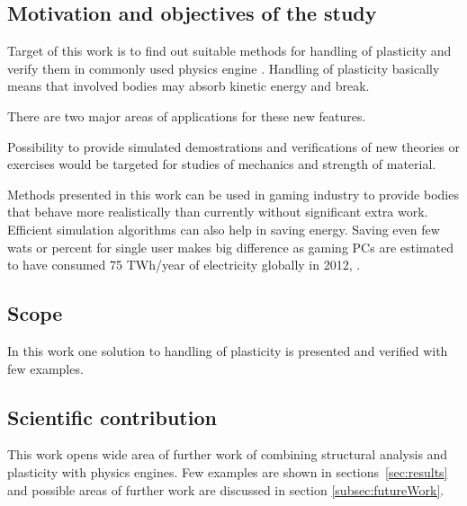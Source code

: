 \subsection{Motivation and objectives of the study}

Target of this work is to find out suitable methods for handling of plasticity and verify them 
in commonly used physics engine \bullet. 
Handling of plasticity basically means that involved bodies may absorb kinetic energy and break. 

There are two major areas of applications for these new features.

Possibility to provide simulated demostrations and verifications of new theories or exercises  would be targeted for 
studies of mechanics and strength of material. 
 
Methods presented in this work can be used in gaming industry to provide 
bodies that behave more realistically than currently without significant extra work. 
Efficient simulation algorithms can also help in saving energy. 
Saving even few wats or percent for single user makes big difference as gaming PCs are estimated to have consumed 
75 TWh/year of electricity globally in 2012, \cite{gaming.energy}.

\subsection{Scope}

In this work one solution to handling of plasticity is presented and verified with few examples.

\subsection{Scientific contribution}

This work opens wide area of further work of combining structural analysis and plasticity with physics engines.
Few examples are shown in sections~\ref{sec:results} and possible areas of further work are discussed in section \ref{subsec:futureWork}.

\cleardoublepage
